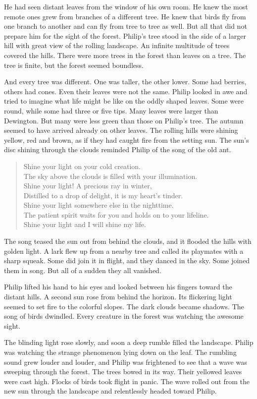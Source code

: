 \documentclass[10pt, draft]{memoir}
\newcommand{\sunsong}{
  Shine your light on your cold creation. \\
  The sky above the clouds is filled with your illumination. \\
  Shine your light! A precious ray in winter, \\
  Distilled to a drop of delight, it is my heart's tinder. \\
  Shine your light somewhere else in the nighttime. \\
  The patient spirit waits for you and holds on to your lifeline. \\
  Shine your light and I will shine my life.
}
\begin{document}
He had seen distant leaves from the window of his own room. He knew the most remote ones grew from branches of a different tree. He knew that birds fly from one branch to another and can fly from tree to tree as well. But all that did not prepare him for the sight of the forest. Philip's tree stood in the side of a larger hill with great view of the rolling landscape. An infinite multitude of trees covered the hills. There were more trees in the forest than leaves on a tree. The tree is finite, but the forest seemed boundless.

And every tree was different. One was taller, the other lower. Some had berries, others had cones. Even their leaves were not the same. Philip looked in awe and tried to imagine what life might be like on the oddly shaped leaves. Some were round, while some had three or five tips. Many leaves were larger than Dewington. But many were less green than those on Philip's tree. The autumn seemed to have arrived already on other leaves. The rolling hills were shining yellow, red and brown, as if they had caught fire from the setting sun. The sun's disc shining through the clouds reminded Philip of the song of the old ant.


\begin{verse}
\sunsong
\end{verse}


The song teased the sun out from behind the clouds, and it flooded the hills with golden light. A lark flew up from a nearby tree and called its playmates with a sharp squeak. Some did join it in flight, and they danced in the sky. Some joined them in song. But all of a sudden they all vanished.

Philip lifted his hand to his eyes and looked between his fingers toward the distant hills. A second sun rose from behind the horizon. Its flickering light seemed to set fire to the colorful slopes. The dark clouds became shadows. The song of birds dwindled. Every creature in the forest was watching the awesome sight.

The blinding light rose slowly, and soon a deep rumble filled the landscape. Philip was watching the strange phenomenon lying down on the leaf. The rumbling sound grew louder and louder, and Philip was frightened to see that a wave was sweeping through the forest. The trees bowed in its way. Their yellowed leaves were cast high. Flocks of birds took flight in panic. The wave rolled out from the new sun through the landscape and relentlessly headed toward Philip.
\end{document}
